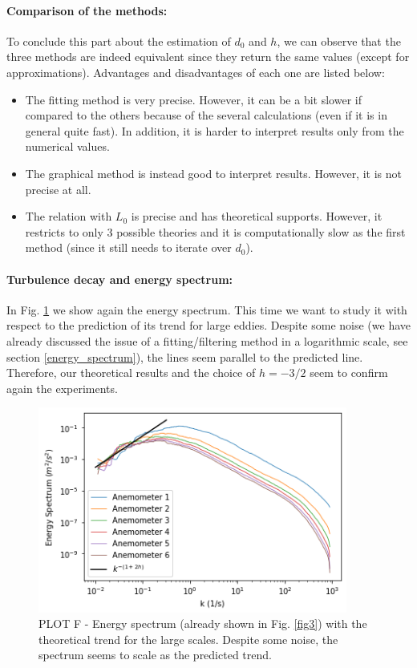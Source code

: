 \documentclass[11pt,titlepage]{article}
\begin{document}
\paragraph{Comparison of the methods:}
To conclude this part about the estimation of $d_0$ and $h$, we can observe that the three methods are indeed equivalent since they return the same values (except for approximations). Advantages and disadvantages of each one are listed below:
\begin{itemize}
	\item The fitting method is very precise. However, it can be a bit slower if compared to the others because of the several calculations (even if it is in general quite fast). In addition, it is harder to interpret results only from the numerical values.
	\item The graphical method is instead good to interpret results. However, it is not precise at all. 
	\item The relation with $L_0$ is precise and has theoretical supports. However, it restricts to only 3 possible theories and it is computationally slow as the first method (since it still needs to iterate over $d_0$).
\end{itemize}

\paragraph{Turbulence decay and energy spectrum: } 
 In Fig. \ref{fig8} we show again the energy spectrum. This time we want to study it with respect to the prediction of its trend for large eddies. Despite some noise (we have already discussed the issue of a fitting/filtering method in a logarithmic scale, see section \ref{energy_spectrum}), the lines seem parallel to the predicted line. Therefore, our theoretical results and the choice of $h=-3/2$ seem to confirm again the experiments.
 
 	\begin{center} 
 	\begin{figure} [h]
 		\centering
 		\includegraphics[width = 4in]{./figures/ex1_5_4.png}
 		\caption{PLOT F - Energy spectrum (already shown in Fig. \ref{fig3}) with the theoretical trend for the large scales. Despite some noise, the spectrum seems to scale as the predicted trend.}
 		\label{fig8}
 	\end{figure}
 \end{center}
\end{document}

